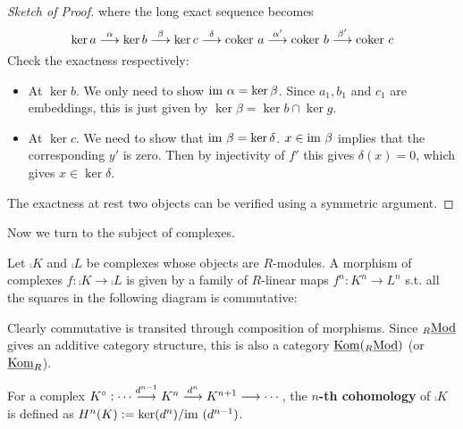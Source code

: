 \documentclass{article}
\begin{document}
\begin{proof}[Sketch of Proof]
    where the long exact sequence becomes
    \[
        \ker a \overset{\alpha}{\longrightarrow} \ker b \overset{\beta}{\longrightarrow} \ker c \overset{\delta}{\longrightarrow} \mathrm{coker}\  a \overset{\alpha'}{\longrightarrow} \mathrm{coker}\  b \overset{\beta'}{\longrightarrow} \mathrm{coker}\  c
    \]
    Check the exactness respectively:
    \begin{itemize}
        \item At $\ker b$. We only need to show $\mathrm{im}\  \alpha = \ker \beta$. Since $a_1, b_1$ and $c_1$ are embeddings, this is just given by $\ker \beta = \ker b \cap \ker g$. 
        \item At $\ker c$. We need to show that $\mathrm{im}\  \beta = \ker \delta $. $x \in \mathrm{im}\  \beta$ implies that the corresponding $y'$ is zero. Then by injectivity of $f'$ this gives $\delta(x) = 0$, which gives $x \in \ker \delta$.
    \end{itemize}
    The exactness at rest two objects can be verified using a symmetric argument. 
\end{proof}

Now we turn to the subject of complexes.

\begin{definition}
    Let $\comp{K}$ and $\comp{L}$ be complexes whose objects are $R$-modules. A morphism of complexes $f: \comp{K} \to \comp{L}$ is given by a family of $R$-linear maps $f^n: K^n \to L^n$ s.t. all the squares in the following diagram is commutative:
    \begin{figure}
        \centering
    \end{figure}
\end{definition}

\begin{remark}
    Clearly commutative is transited through composition of morphisms. Since ${}_{R}\underline{\textup{Mod}}$ gives an additive category structure, this is also a category $\underline{\mathrm{Kom}}({}_{R}\underline{\textup{Mod}})$ (or $\underline{\mathrm{Kom}}_R$).
\end{remark}

\begin{definition}[Cohomology]
    For a complex $K^{\circ}: \cdots \overset{d^{n-1}}{\longrightarrow} K^n \overset{d^n}{\longrightarrow} K^{n+1} \longrightarrow \cdots$, the \textbf{$n$-th cohomology} of $\comp{K}$ is defined as $H^n(K) := \ker(d^n)/ \mathrm{im}\ (d^{n-1})$.
\end{definition}
\end{document}
